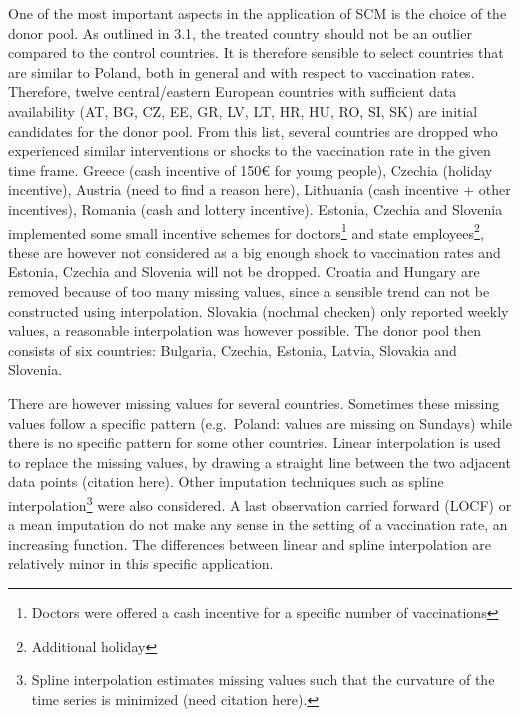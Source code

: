 \documentclass{scrbook}
\begin{document}
One of the most important aspects in the application of SCM is the
choice of the donor pool. As outlined in 3.1, the treated country should
not be an outlier compared to the control countries. It is therefore
sensible to select countries that are similar to Poland, both in general
and with respect to vaccination rates. Therefore, twelve central/eastern
European countries with sufficient data availability (AT, BG, CZ, EE,
GR, LV, LT, HR, HU, RO, SI, SK) are initial candidates for the donor
pool. From this list, several countries are dropped who experienced
similar interventions or shocks to the vaccination rate in the given
time frame. Greece (cash incentive of 150€ for young people), Czechia
(holiday incentive), Austria (need to find a reason here), Lithuania
(cash incentive + other incentives), Romania (cash and lottery
incentive). Estonia, Czechia and Slovenia implemented some small
incentive schemes for
doctors\footnote{Doctors were offered a cash incentive for a specific number of vaccinations}
and state employees\footnote{Additional holiday}, these are however not
considered as a big enough shock to vaccination rates and Estonia,
Czechia and Slovenia will not be dropped. Croatia and Hungary are
removed because of too many missing values, since a sensible trend can
not be constructed using interpolation. Slovakia (nochmal checken) only
reported weekly values, a reasonable interpolation was however possible.
The donor pool then consists of six countries: Bulgaria, Czechia,
Estonia, Latvia, Slovakia and Slovenia.

There are however missing values for several countries. Sometimes these
missing values follow a specific pattern (e.g.~Poland: values are
missing on Sundays) while there is no specific pattern for some other
countries. Linear interpolation is used to replace the missing values,
by drawing a straight line between the two adjacent data points
(citation here). Other imputation techniques such as spline
interpolation\footnote{Spline interpolation estimates missing values such that the curvature of the time series is minimized (need citation here).}
were also considered. A last observation carried forward (LOCF) or a
mean imputation do not make any sense in the setting of a vaccination
rate, an increasing function. The differences between linear and spline
interpolation are relatively minor in this specific application.
\end{document}
